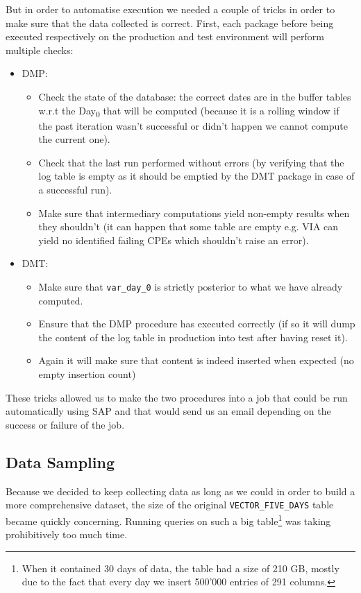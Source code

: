 But in order to automatise execution we needed a couple of tricks in order to make sure that the data collected is correct. First, each package before being executed respectively on the production and test environment will perform multiple checks:
 \begin{itemize}
	\item DMP:  \begin{itemize}[noitemsep,topsep=0pt]
					\item Check the state of the database: the correct dates are in the buffer tables w.r.t the Day\textsubscript{0} that will be computed (because it is a rolling window if the past iteration wasn't successful or didn't happen we cannot compute the current one).
					\item Check that the last run performed without errors (by verifying that the log table is empty as it should be emptied by the DMT package in case of a successful run).
					\item Make sure that intermediary computations yield non-empty results when they shouldn't (it can happen that some table are empty e.g. VIA can yield no identified failing CPEs which shouldn't raise an error).
				\end{itemize}
	\item DMT: 	\begin{itemize}[noitemsep,topsep=0pt]
					\item Make sure that \texttt{var\_day\_0} is strictly posterior to what we have already computed.
					\item Ensure that the DMP procedure has executed correctly (if so it will dump the content of the log table in production into test after having reset it).
					\item Again it will make sure that content is indeed inserted when expected (no empty insertion count)
				\end{itemize}
\end{itemize}	

These tricks allowed us to make the two procedures into a job that could be run automatically using SAP and that would send us an email depending on the success or failure of the job. 

\subsection{Data Sampling}
\label{subsec:data_sampling}

Because we decided to keep collecting data as long as we could in order to build a more comprehensive dataset, the size of the original \texttt{VECTOR\_FIVE\_DAYS} table became quickly concerning. Running queries on such a big table\footnote{When it contained 30 days of data, the table had a size of 210 GB, mostly due to the fact that every day we insert 500'000 entries of 291 columns.} was taking prohibitively too much time. 

